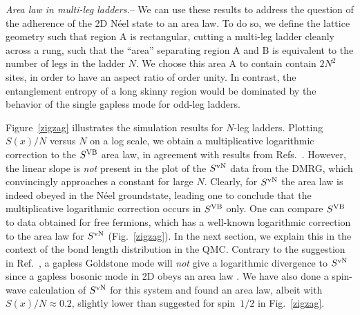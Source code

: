 \documentclass[prl,aps,twocolumn,floatfix,amsmath,amssymb,superscriptaddress,tightenlines]{revtex4}
\begin{document}
 
{\it Area law in multi-leg ladders.}--  
We can use these results to address the question of the adherence of the 2D N\'eel state
to an area law.  To do so, we
define the lattice
geometry such that region A is rectangular, cutting a multi-leg ladder
cleanly across a rung, such that the ``area'' separating region A and B is
equivalent to the number of legs in the ladder $N$.  We choose this area A
to contain contain $2N^2$ sites, in order to have an aspect ratio of order unity.  In
contrast, the entanglement entropy of a long
skinny region would be dominated by the behavior
of the single gapless mode for odd-leg ladders.

Figure~\ref{zigzag} illustrates the simulation results for $N$-leg ladders.
Plotting $S(x)/N$ versus $N$ on a log scale, we obtain a
multiplicative logarithmic correction to the $S^{\rm VB}$ area law, in agreement
with results from Refs.~\cite{Alet,Chh}.  However, the linear slope is {\it not} present in
the plot of the $S^{ \rm vN}$ data from the DMRG, which convincingly approaches a
constant for large $N$.  Clearly, for $S^{ \rm vN}$ the area law is
indeed obeyed in the N\'eel groundstate, leading one to conclude that the
multiplicative logarithmic correction occurs in $S^{\rm VB}$ only.  One can
compare $S^{\rm VB}$ to data obtained for free fermions, which has a well-known \cite{2dfermion} logarithmic correction to the area law for $S^{ \rm vN}$ (Fig.~\ref{zigzag}).
In the next section, we explain this 
in the context of the bond length distribution in the QMC.
Contrary to the suggestion in Ref.~\cite{Alet}, a gapless Goldstone mode will {\it not} give a logarithmic
divergence to $S^{ \rm vN}$ since a gapless bosonic mode in 2D
obeys an area law \cite{2dboson}.  We have also done a spin-wave calculation of
$S^{\rm vN}$ for this system and found an area law, albeit with
$S(x)/N\approx 0.2$, slightly lower than suggested for spin~$1/2$ in Fig.~\ref{zigzag}.
\end{document}
